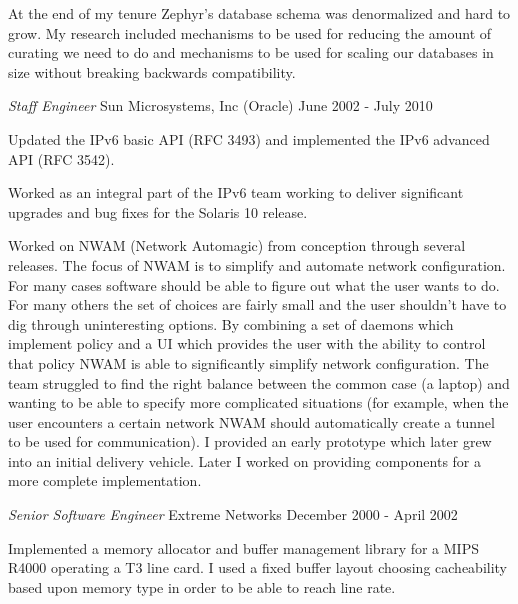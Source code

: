 \documentclass[margin]{res}
\begin{document}
\begin{resume}
                At the end of my tenure Zephyr's database schema was
                denormalized and hard to grow. My research included
                mechanisms to be used for reducing the amount of
                curating we need to do and mechanisms to be used for
                scaling our databases in size without breaking backwards
                compatibility.

                {\sl Staff Engineer} Sun Microsystems, Inc (Oracle) \hfill June 2002 - July 2010

                Updated the IPv6 basic API (RFC 3493) and implemented the IPv6 advanced API (RFC 3542).

                Worked as an integral part of the IPv6 team working
                to deliver significant upgrades and bug fixes for the
                Solaris 10 release.

                Worked on NWAM (Network Automagic) from conception
                through several releases. The focus of NWAM is to
                simplify and automate network configuration. For many
                cases software should be able to figure out what the
                user wants to do. For many others the set of choices are
                fairly small and the user shouldn't have to dig through
                uninteresting options. By combining a set of daemons
                which implement policy and a UI which provides the user
                with the ability to control that policy NWAM is able
                to significantly simplify network configuration. The
                team struggled to find the right balance between the
                common case (a laptop) and wanting to be able to specify
                more complicated situations (for example, when the user
                encounters a certain network NWAM should automatically
                create a tunnel to be used for communication). I
                provided an early prototype which later grew into an
                initial delivery vehicle. Later I worked on providing
                components for a more complete implementation.

                {\sl Senior Software Engineer} Extreme Networks \hfill December 2000 - April 2002

                Implemented a memory allocator and buffer management library for a MIPS
                R4000 operating a T3 line card. I used a fixed buffer layout choosing
                cacheability based upon memory type in order to be able to reach line
                rate.


\end{resume}
\end{document}
